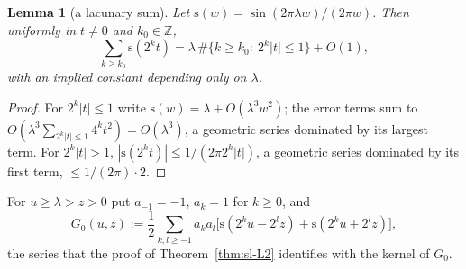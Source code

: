 \documentclass[11pt]{amsart}
\newtheorem{lemma}[theorem]{Lemma}
\theoremstyle{definition}
\theoremstyle{remark}
\newcommand{\Z}{\mathbb Z}
\begin{document}
\begin{lemma}[a lacunary sum]\label{lem:sl-lac}
Let $\mathrm s(w)=\sin(2\pi\lambda w)/(2\pi w)$. Then uniformly in $t\ne0$ and $k_0\in\Z$,
\[
\sum_{k\ge k_0}\mathrm s(2^kt)=\lambda\,\#\{k\ge k_0:\ 2^k|t|\le1\}+O(1),
\]
with an implied constant depending only on $\lambda$.
\end{lemma}
\begin{proof}
For $2^k|t|\le1$ write $\mathrm s(w)=\lambda+O(\lambda^3w^2)$; the error terms sum to $O(\lambda^3\sum_{2^k|t|\le1}4^kt^2)=O(\lambda^3)$, a
geometric series dominated by its largest term. For $2^k|t|>1$, $|\mathrm s(2^kt)|\le1/(2\pi2^k|t|)$, a geometric series
dominated by its first term, $\le1/(2\pi)\cdot2$.
\end{proof}


For $u\ge\lambda>z>0$ put $a_{-1}=-1$, $a_k=1$ for $k\ge0$, and
\begin{equation}\label{eq:G0series}
G_0(u,z):=\frac12\sum_{k,l\ge-1}a_ka_l\big[\mathrm s(2^ku-2^lz)+\mathrm s(2^ku+2^lz)\big],
\end{equation}
the series that the proof of Theorem~\ref{thm:sl-L2} identifies with the kernel of $G_0$.
\end{document}
